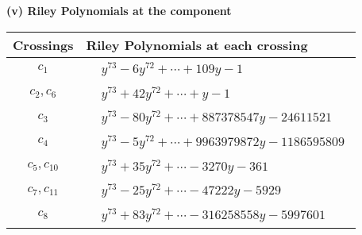 \documentclass[1p]{elsarticle_modified}
\theoremstyle{definition}
\begin{document}
\newpage\renewcommand{\arraystretch}{1}
\flushleft \textbf{(v) Riley Polynomials at the component}\newline \\
\begin{tabular}{m{50pt}|m{274pt}}
Crossings & \hspace{64pt}Riley Polynomials at each crossing \\
\hline $$\begin{aligned}c_{1}\end{aligned}$$&$\begin{aligned}
&y^{73}-6 y^{72}+\cdots+109 y-1
\end{aligned}$\\
\hline $$\begin{aligned}c_{2},c_{6}\end{aligned}$$&$\begin{aligned}
&y^{73}+42 y^{72}+\cdots+y-1
\end{aligned}$\\
\hline $$\begin{aligned}c_{3}\end{aligned}$$&$\begin{aligned}
&y^{73}-80 y^{72}+\cdots+887378547 y-24611521
\end{aligned}$\\
\hline $$\begin{aligned}c_{4}\end{aligned}$$&$\begin{aligned}
&y^{73}-5 y^{72}+\cdots+9963979872 y-1186595809
\end{aligned}$\\
\hline $$\begin{aligned}c_{5},c_{10}\end{aligned}$$&$\begin{aligned}
&y^{73}+35 y^{72}+\cdots-3270 y-361
\end{aligned}$\\
\hline $$\begin{aligned}c_{7},c_{11}\end{aligned}$$&$\begin{aligned}
&y^{73}-25 y^{72}+\cdots-47222 y-5929
\end{aligned}$\\
\hline $$\begin{aligned}c_{8}\end{aligned}$$&$\begin{aligned}
&y^{73}+83 y^{72}+\cdots-316258558 y-5997601
\end{aligned}$\\

\end{tabular}
\end{document}

